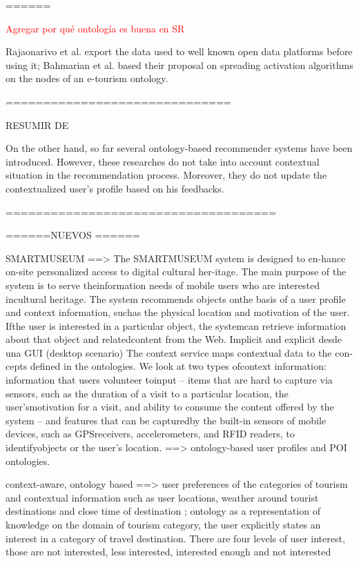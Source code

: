 ======


\textcolor{red}{Agregar por qué ontología es buena en SR}


Rajaonarivo et al. \cite{rajaonarivo2019rec} export the data used to well known open data platforms before using it; Bahmarian et al. \cite{bahramian_abbaspour_claramunt_2017} based their proposal on spreading activation algorithms on the nodes of an e-tourism ontology.

==============================

RESUMIR DE \cite{bahramian_abbaspour_claramunt_2017}


On  the other hand,  so  far  several  ontology-based  recommender systems  have  been  introduced. However,  these  researches  do  not take  into  account  contextual  situation  in the recommendation process. Moreover, they do not update the contextualized user’s profile based on his feedbacks.

====================================

======NUEVOS ======


 \cite{ruotsalo2013smartmuseum} SMARTMUSEUM ==> The  SMARTMUSEUM  system  is  designed  to  en-hance on-site personalized access to digital cultural her-itage.  The main purpose of the system is to serve theinformation needs of mobile users who are interested incultural heritage.  The system recommends objects onthe basis of a user profile and context information, suchas the physical location and motivation of the user.  Ifthe user is interested in a particular object, the systemcan  retrieve  information  about  that  object  and  relatedcontent  from  the  Web.
 Implicit and explicit desde una GUI (desktop scenario)
 The context service maps contextual data to the con-cepts defined in the ontologies. We look at two types ofcontext information: information that users volunteer toinput – items that are hard to capture via sensors, such as the duration of a visit to a particular location, the user’smotivation for a visit, and ability to consume the content
 offered by the system – and features that can be capturedby the built-in sensors of mobile devices, such as GPSreceivers, accelerometers, and RFID readers, to identifyobjects or the user’s location. ==> ontology-based user profiles and POI ontologies.
 
 


\cite{arigi2018context} context-aware, ontology based
==> user  preferences  of  the  categories  of  tourism  and contextual information such as user locations, weather around tourist destinations and close time of   destination ; ontology as a representation of knowledge on the domain of tourism  category, the  user explicitly  states  an interest in a category of travel destination. There are four levels of user interest, those are not interested, less interested, interested enough and not interested

